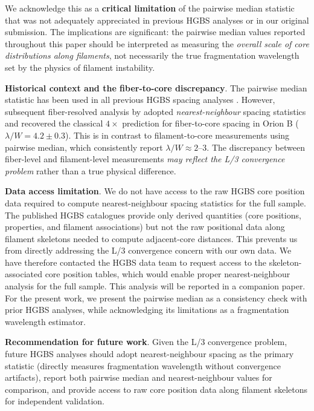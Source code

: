 \documentclass[twocolumn,usenatbib]{mnras}
\begin{document}
We acknowledge this as a \textbf{critical limitation} of the pairwise median statistic that was not adequately appreciated in previous HGBS analyses or in our original submission. The implications are significant: the pairwise median values reported throughout this paper should be interpreted as measuring the \textit{overall scale of core distributions along filaments}, not necessarily the true fragmentation wavelength set by the physics of filament instability.

\textbf{Historical context and the fiber-to-core discrepancy}. The pairwise median statistic has been used in all previous HGBS spacing analyses \citep{Arzoumanian2011, Arzoumanian2019}. However, subsequent fiber-resolved analysis by \citet{Hacar2013, Hacar2018} adopted \textit{nearest-neighbour} spacing statistics and recovered the classical $4\times$ prediction for fiber-to-core spacing in Orion B ($\lambda/W = 4.2 \pm 0.3$). This is in contrast to filament-to-core measurements using pairwise median, which consistently report $\lambda/W \approx 2$--$3$. The discrepancy between fiber-level and filament-level measurements \textit{may reflect the L/3 convergence problem} rather than a true physical difference.

\textbf{Data access limitation}. We do not have access to the raw HGBS core position data required to compute nearest-neighbour spacing statistics for the full sample. The published HGBS catalogues provide only derived quantities (core positions, properties, and filament associations) but not the raw positional data along filament skeletons needed to compute adjacent-core distances. This prevents us from directly addressing the L/3 convergence concern with our own data. We have therefore contacted the HGBS data team to request access to the skeleton-associated core position tables, which would enable proper nearest-neighbour analysis for the full sample. This analysis will be reported in a companion paper. For the present work, we present the pairwise median as a consistency check with prior HGBS analyses, while acknowledging its limitations as a fragmentation wavelength estimator.

\textbf{Recommendation for future work}. Given the L/3 convergence problem, future HGBS analyses should adopt nearest-neighbour spacing as the primary statistic (directly measures fragmentation wavelength without convergence artifacts), report both pairwise median and nearest-neighbour values for comparison, and provide access to raw core position data along filament skeletons for independent validation.
\end{document}
